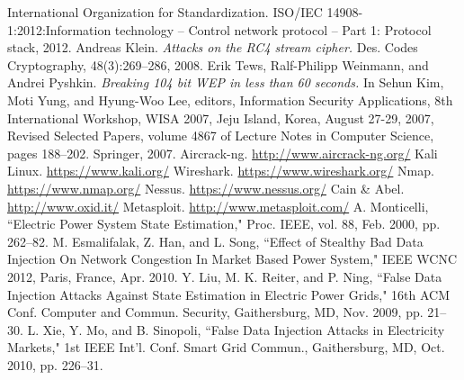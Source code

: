 \begin{thebibliography}{99}
 International Organization for Standardization. ISO/IEC 14908-1:2012:Information technology – Control network protocol – Part 1: Protocol stack, 2012.
 Andreas Klein. \emph{Attacks on the RC4 stream cipher.} Des. Codes Cryptography, 48(3):269–286, 2008.
 Erik Tews, Ralf-Philipp Weinmann, and Andrei Pyshkin. \emph{Breaking 104 bit WEP in less than 60 seconds.} In Sehun Kim, Moti Yung, and Hyung-Woo Lee, editors, Information Security Applications, 8th International Workshop, WISA 2007, Jeju Island, Korea, August 27-29, 2007, Revised Selected Papers, volume 4867 of Lecture Notes in Computer Science, pages 188–202. Springer, 2007.
 Aircrack-ng. \url{http://www.aircrack-ng.org/}
 Kali Linux. \url{https://www.kali.org/}
 Wireshark. \url{https://www.wireshark.org/}
 Nmap. \url{https://www.nmap.org/}
 Nessus. \url{https://www.nessus.org/}
 Cain \& Abel. \url{http://www.oxid.it/}
 Metasploit. \url{http://www.metasploit.com/}
 A. Monticelli, ``Electric Power System State Estimation," Proc. IEEE, vol. 88, Feb. 2000, pp. 262–82.
 M. Esmalifalak, Z. Han, and L. Song, ``Effect of Stealthy Bad Data Injection On Network Congestion In Market Based Power System," IEEE WCNC 2012, Paris, France, Apr. 2010.
 Y. Liu, M. K. Reiter, and P. Ning, ``False Data Injection Attacks Against State Estimation in Electric Power Grids," 16th ACM Conf. Computer and Commun. Security, Gaithersburg, MD, Nov. 2009, pp. 21–30.
 L. Xie, Y. Mo, and B. Sinopoli, ``False Data Injection Attacks in Electricity Markets," 1st IEEE Int’l. Conf. Smart Grid Commun., Gaithersburg, MD, Oct. 2010, pp. 226–31.
\end{thebibliography}